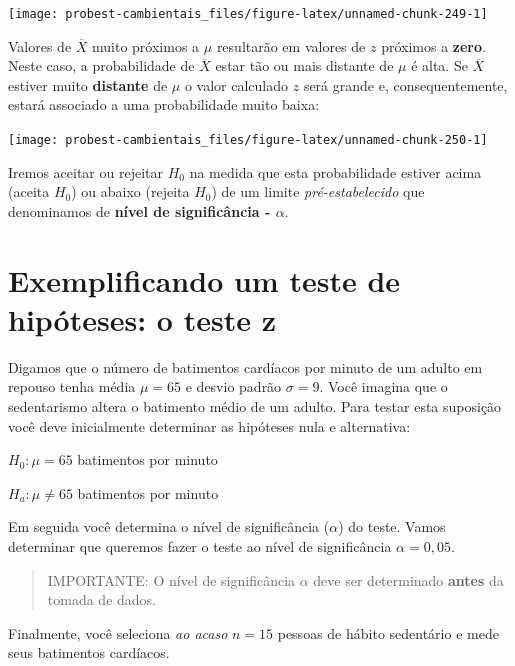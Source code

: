 \documentclass[
]{book}
\begin{document}
\begin{center}\texttt{[image: probest-cambientais\_files/figure-latex/unnamed-chunk-249-1]} \end{center}

Valores de \(\overline{X}\) muito próximos a \(\mu\) resultarão em valores de \(z\) próximos a \textbf{zero}. Neste caso, a probabilidade de \(\overline{X}\) estar tão ou mais distante de \(\mu\) é alta. Se \(\overline{X}\) estiver muito \textbf{distante} de \(\mu\) o valor calculado \(z\) será grande e, consequentemente, estará associado a uma probabilidade muito baixa:

\begin{center}\texttt{[image: probest-cambientais\_files/figure-latex/unnamed-chunk-250-1]} \end{center}

Iremos aceitar ou rejeitar \(H_0\) na medida que esta probabilidade estiver acima (aceita \(H_0\)) ou abaixo (rejeita \(H_0\)) de um limite \emph{pré-estabelecido} que denominamos de \textbf{nível de significância - \(\alpha\)}.

\hypertarget{exemplificando-um-teste-de-hipuxf3teses-o-teste-z}{%
\section{Exemplificando um teste de hipóteses: o teste z}\label{exemplificando-um-teste-de-hipuxf3teses-o-teste-z}}

Digamos que o número de batimentos cardíacos por minuto de um adulto em repouso tenha média \(\mu = 65\) e desvio padrão \(\sigma = 9\). Você imagina que o sedentarismo altera o batimento médio de um adulto. Para testar esta suposição você deve inicialmente determinar as hipóteses nula e alternativa:

\(H_0: \mu = 65\) batimentos por minuto

\(H_a: \mu \ne 65\) batimentos por minuto

Em seguida você determina o nível de significância (\(\alpha\)) do teste. Vamos determinar que queremos fazer o teste ao nível de significância \(\alpha = 0,05\).

\begin{quote}
IMPORTANTE: O nível de significância \(\alpha\) deve ser determinado \textbf{antes} da tomada de dados.
\end{quote}

Finalmente, você seleciona \emph{ao acaso} \(n = 15\) pessoas de hábito sedentário e mede seus batimentos cardíacos.
\end{document}
